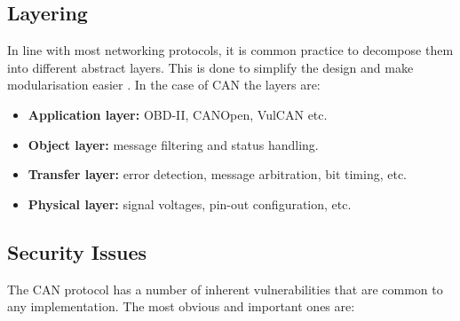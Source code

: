 \subsection{Layering}
\label{subsec:can:layering}

In line with most networking protocols, it is common practice to decompose them into different abstract layers. This is done to simplify the design and make modularisation easier \cite{wiki:ProtocolStack}. In the case of CAN the layers are:

\begin{itemize}
	\item \textbf{Application layer:} OBD-II, CANOpen, VulCAN etc.
	\item \textbf{Object layer:} message filtering and status handling.
	\item \textbf{Transfer layer:} error detection, message arbitration, bit timing, etc.
	\item \textbf{Physical layer:} signal voltages, pin-out configuration, etc.
\end{itemize}

\subsection{Security Issues}
\label{subsec:can:security_issues}

The CAN protocol has a number of inherent vulnerabilities that are common to any implementation. The most obvious and important ones are:


